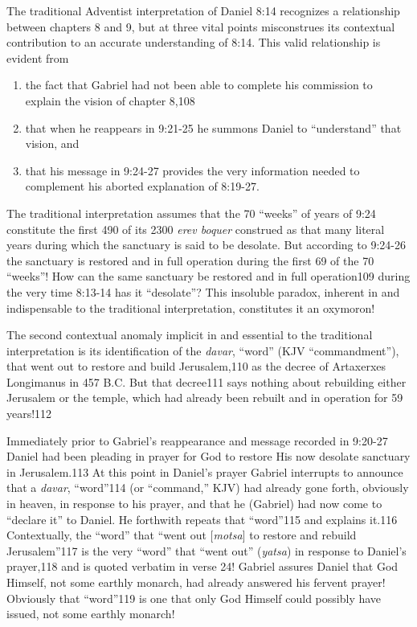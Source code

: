 The traditional Adventist interpretation of Daniel 8:14 recognizes a
relationship between chapters 8 and 9, but at three vital points
misconstrues its contextual contribution to an accurate understanding of
8:14. This valid relationship is evident from
\begin{enumerate}
	\item the fact that
Gabriel had not been able to complete his commission to explain the vision
of chapter 8,108 
	\item that when he reappears in 9:21-25 he summons Daniel to
``understand'' that vision, and 
	\item that his message in 9:24-27 provides the
very information needed to complement his aborted explanation of 8:19-27.
\end{enumerate}

The traditional interpretation assumes that the 70 ``weeks'' of years of 9:24
constitute the first 490 of its 2300 \textit{erev boquer} construed as that many
literal years during which the sanctuary is said to be desolate. But
according to 9:24-26 the sanctuary is restored and in full operation during
the first 69 of the 70 ``weeks''! How can the same sanctuary be restored and
in full operation109 during the very time 8:13-14 has it ``desolate''? This
insoluble paradox, inherent in and indispensable to the traditional
interpretation, constitutes it an oxymoron!

The second contextual anomaly implicit in and essential to the traditional
interpretation is its identification of the \textit{davar}, ``word'' (KJV
``commandment''), that went out to restore and build Jerusalem,110 as the
decree of Artaxerxes Longimanus in 457 B.C. But that decree111 says nothing
about rebuilding either Jerusalem or the temple, which had already been
rebuilt and in operation for 59 years!112

Immediately prior to Gabriel's reappearance and message recorded in 9:20-27
Daniel had been pleading in prayer for God to restore His now desolate
sanctuary in Jerusalem.113 At this point in Daniel's prayer Gabriel
interrupts to announce that a \textit{davar}, ``word''114 (or ``command,'' KJV) had
already gone forth, obviously in heaven, in response to his prayer, and that
he (Gabriel) had now come to ``declare it'' to Daniel. He forthwith repeats
that ``word''115 and explains it.116 Contextually, the ``word'' that ``went out
[\textit{motsa}] to restore and rebuild Jerusalem''117 is the very ``word'' that ``went
out'' (\textit{yatsa}) in response to Daniel's prayer,118 and is quoted verbatim in
verse 24! Gabriel assures Daniel that God Himself, not some earthly monarch,
had already answered his fervent prayer! Obviously that ``word''119 is one
that only God Himself could possibly have issued, not some earthly monarch!

